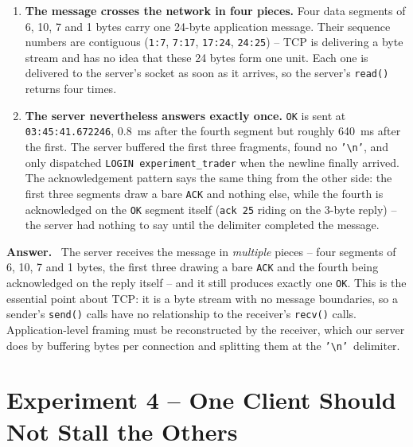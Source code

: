 \documentclass[11pt,a4paper]{article}
\newcommand{\nlch}{\texttt{'\textbackslash n'}}
\newenvironment{answer}
  {\begin{answerbox}\textbf{\color{accent}Answer.}\ }
  {\end{answerbox}}
\begin{document}
\begin{enumerate}[leftmargin=1.6em,itemsep=2pt]
\item \textbf{The message crosses the network in four pieces.}  Four data segments of
      6, 10, 7 and 1 bytes carry one 24-byte application message.  Their sequence
      numbers are contiguous (\texttt{1:7}, \texttt{7:17}, \texttt{17:24},
      \texttt{24:25}) -- TCP is delivering a byte stream and has no idea that these 24
      bytes form one unit.  Each one is delivered to the server's socket as soon as it
      arrives, so the server's \texttt{read()} returns four times.
\item \textbf{The server nevertheless answers exactly once.}  \texttt{OK} is sent at
      \texttt{03:45:41.672246}, 0.8~ms after the fourth segment but roughly 640~ms after
      the first.  The server buffered the first three fragments, found no \nlch, and
      only dispatched \texttt{LOGIN experiment\_trader} when the newline finally
      arrived.  The acknowledgement pattern says the same thing from the other side:
      the first three segments draw a bare \texttt{ACK} and nothing else, while the
      fourth is acknowledged on the \texttt{OK} segment itself (\texttt{ack 25} riding
      on the 3-byte reply) -- the server had nothing to say until the delimiter
      completed the message.
\end{enumerate}

\begin{answer}
The server receives the message in \emph{multiple} pieces -- four segments of 6, 10, 7
and 1 bytes, the first three drawing a bare \texttt{ACK} and the fourth being
acknowledged on the reply itself -- and it still produces exactly one \texttt{OK}.  This is the essential point about TCP: it is a byte stream with no message
boundaries, so a sender's \texttt{send()} calls have no relationship to the receiver's
\texttt{recv()} calls.  Application-level framing must be reconstructed by the receiver,
which our server does by buffering bytes per connection and splitting them at the
\nlch\ delimiter.
\end{answer}

\section{Experiment 4 -- One Client Should Not Stall the Others}
\end{document}
